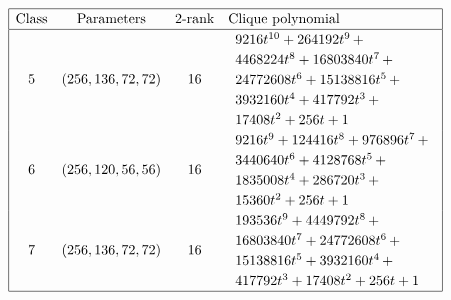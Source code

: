 \documentclass[12pt,a4paper]{article}
\begin{document}
\newpage
\begin{table}[!bhpt] %
\small{}
\begin{align*}
\def\arraystretch{1.2}
\begin{array}{|cccl|}
\hline
\text{Class} &
\text{Parameters} &
\text{2-rank} &
\text{Clique polynomial}
\\
\hline
5 &
(256, 136, 72, 72) &
16 &
\begin{array}{l}
9216t^{10} + 264192t^{9}
\,+
\\
 4468224t^{8} + 16803840t^{7}
\,+
\\
 24772608t^{6} + 15138816t^{5}
\,+
\\
 3932160t^{4} + 417792t^{3}
\,+
\\
 17408t^{2} + 256t + 1
\end{array}
\\
6 &
(256, 120, 56, 56) &
16 &
\begin{array}{l}
9216t^{9} + 124416t^{8} + 976896t^{7}
\,+
\\
 3440640t^{6} + 4128768t^{5}
\,+
\\
 1835008t^{4} + 286720t^{3}
\,+
\\
 15360t^{2} + 256t + 1
\end{array}
\\
7 &
(256, 136, 72, 72) &
16 &
\begin{array}{l}
193536t^{9} + 4449792t^{8}
\,+
\\
 16803840t^{7} + 24772608t^{6}
\,+
\\
 15138816t^{5} + 3932160t^{4}
\,+
\\
 417792t^{3} + 17408t^{2} + 256t + 1
\end{array}
\\
\hline
\end{array}
\end{align*}
\caption{$f_{8,9}$ extended Cayley classes (part 2)}
\label{tab-c8_9_EC_classes_2}
\end{table}
\end{document}
